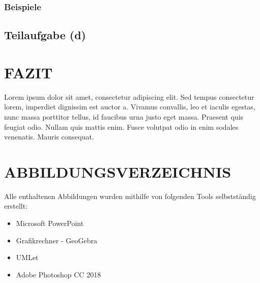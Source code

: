 \documentclass[a4paper,12pt]{article}
\begin{document}
\subsubsection{Beispiele}

\subsection{Teilaufgabe (d)}



\newpage
\section{FAZIT}



Lorem ipsum dolor sit amet, consectetur adipiscing elit. Sed tempus consectetur lorem, imperdiet dignissim est auctor a. Vivamus convallis, leo et iaculis egestas, nunc massa porttitor tellus, id faucibus urna justo eget massa. Praesent quis feugiat odio. Nullam quis mattis enim. Fusce volutpat odio in enim sodales venenatis. Mauris consequat.


\newpage
\section{ABBILDUNGSVERZEICHNIS}
Alle enthaltenen Abbildungen wurden mithilfe von folgenden Tools selbstständig erstellt:
\begin{itemize}
\item Microsoft PowerPoint
\item Grafikrechner - GeoGebra
\item UMLet
\item Adobe Photoshop CC 2018 
\end{itemize}

\end{document}
